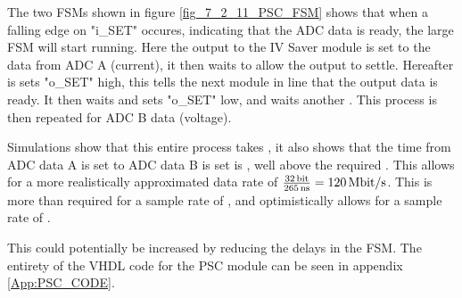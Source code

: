 The two FSMs shown in figure \ref{fig_7_2_11_PSC_FSM} shows that when a falling edge on "i\_SET" occures, indicating that the ADC data is ready, the large FSM will start running. Here the output to the IV Saver module is set to the data from ADC A (current), it then waits  to allow the output to settle. Hereafter is sets "o\_SET" high, this tells the next module in line that the output data is ready. It then waits  and sets "o\_SET" low, and waits another . This process is then repeated for ADC B data (voltage).

Simulations show that this entire process takes , it also shows that the time from ADC data A is set to ADC data B is set is , well above the required . This allows for a more realistically approximated data rate of $\frac{\SIQ{32}{\bit}}{\SIQ{265}{\nano\second}} = \SIQ{120}{\mega\bit/\second}$. This is more than required for a sample rate of , and optimistically allows for a sample rate of .

This could potentially be increased by reducing the delays in the FSM. The entirety of the VHDL code for the PSC module can be seen in appendix \ref{App:PSC_CODE}.